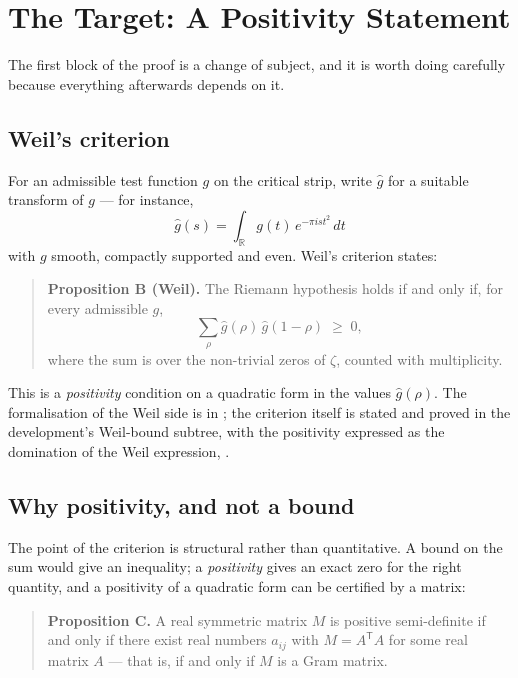 
\chapter{The Target: A Positivity Statement}
\label{ch:target}

The first block of the proof is a change of subject, and it is worth doing
carefully because everything afterwards depends on it.

\section{Weil's criterion}For an admissible test function $g$ on the critical strip, write $\hat g$ for
a suitable transform of $g$ --- for instance,
\begin{equation}
\hat g(s) = \int_{\mathbb{R}} g(t)\,e^{-\pi i s t^2}\,dt
\end{equation}
with $g$ smooth, compactly supported and even. Weil's criterion states:

\begin{quote}
\textbf{Proposition B (Weil).} The Riemann hypothesis holds if and only if, for
every admissible $g$,
\[
\sum_{\rho} \hat g(\rho)\,\hat g(1-\rho) \;\ge\; 0,
\]
where the sum is over the non-trivial zeros of $\zeta$, counted with
multiplicity.
\end{quote}

This is a \emph{positivity} condition on a quadratic form in the values
$\hat g(\rho)$. The formalisation of the Weil side is in
; the criterion itself is stated and proved in
the development's Weil-bound subtree, with the positivity expressed as the
domination of the Weil expression,
.

\section{Why positivity, and not a bound}The point of the criterion is structural rather than quantitative. A bound on
the sum would give an inequality; a \emph{positivity} gives an exact zero for
the right quantity, and a positivity of a quadratic form can be certified by a
matrix:

\begin{quote}
\textbf{Proposition C.} A real symmetric matrix $M$ is positive semi-definite
if and only if there exist real numbers $a_{ij}$ with
$M = A^{\mathsf T} A$ for some real matrix $A$ --- that is, if and only if
$M$ is a Gram matrix.
\end{quote}

